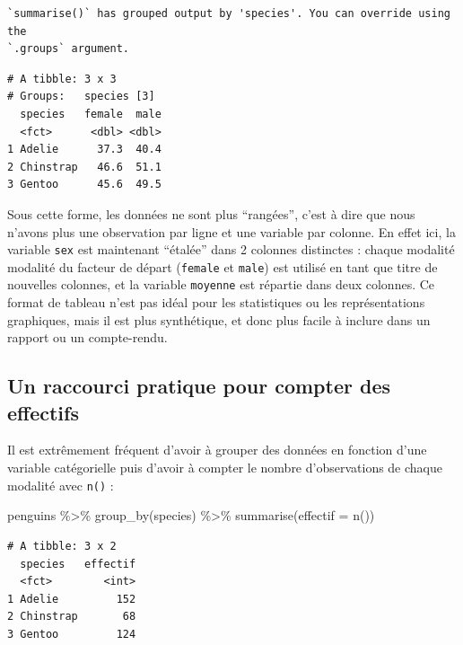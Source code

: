 \documentclass[
  a4paper,
  DIV=11,
  numbers=noendperiod,
  oneside]{scrreprt}
\newenvironment{Shaded}{}{}
\newcommand{\AttributeTok}[1]{\textcolor[rgb]{0.84,0.23,0.29}{#1}}
\newcommand{\FunctionTok}[1]{\textcolor[rgb]{0.44,0.26,0.76}{#1}}
\newcommand{\NormalTok}[1]{\textcolor[rgb]{0.14,0.16,0.18}{#1}}
\newcommand{\SpecialCharTok}[1]{\textcolor[rgb]{0.00,0.36,0.77}{#1}}
\begin{document}
\begin{verbatim}
`summarise()` has grouped output by 'species'. You can override using the
`.groups` argument.
\end{verbatim}

\begin{verbatim}
# A tibble: 3 x 3
# Groups:   species [3]
  species   female  male
  <fct>      <dbl> <dbl>
1 Adelie      37.3  40.4
2 Chinstrap   46.6  51.1
3 Gentoo      45.6  49.5
\end{verbatim}

Sous cette forme, les données ne sont plus ``rangées'', c'est à dire que
nous n'avons plus une observation par ligne et une variable par colonne.
En effet ici, la variable \texttt{sex} est maintenant ``étalée'' dans 2
colonnes distinctes : chaque modalité modalité du facteur de départ
(\texttt{female} et \texttt{male}) est utilisé en tant que titre de
nouvelles colonnes, et la variable \texttt{moyenne} est répartie dans
deux colonnes. Ce format de tableau n'est pas idéal pour les
statistiques ou les représentations graphiques, mais il est plus
synthétique, et donc plus facile à inclure dans un rapport ou un
compte-rendu.

\hypertarget{un-raccourci-pratique-pour-compter-des-effectifs}{%
\subsection{Un raccourci pratique pour compter des
effectifs}\label{un-raccourci-pratique-pour-compter-des-effectifs}}

Il est extrêmement fréquent d'avoir à grouper des données en fonction
d'une variable catégorielle puis d'avoir à compter le nombre
d'observations de chaque modalité avec \texttt{n()} :

\begin{Shaded}
\begin{Highlighting}[]
\NormalTok{penguins }\SpecialCharTok{\%\textgreater{}\%} 
  \FunctionTok{group\_by}\NormalTok{(species) }\SpecialCharTok{\%\textgreater{}\%} 
  \FunctionTok{summarise}\NormalTok{(}\AttributeTok{effectif =} \FunctionTok{n}\NormalTok{())}
\end{Highlighting}
\end{Shaded}

\begin{verbatim}
# A tibble: 3 x 2
  species   effectif
  <fct>        <int>
1 Adelie         152
2 Chinstrap       68
3 Gentoo         124
\end{verbatim}
\end{document}
